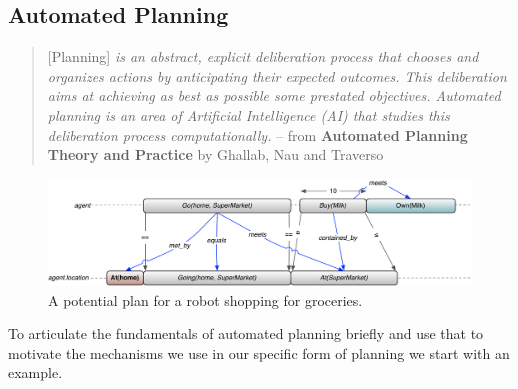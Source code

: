 \subsection{Automated Planning}
\label{sec:planningfound}

{\scriptsize
  \begin{quote}
[Planning] \emph{is an abstract, explicit deliberation process that chooses and
organizes actions by anticipating their expected outcomes. This
deliberation aims at achieving as best as possible some prestated
objectives. Automated planning is an area of Artificial Intelligence
(AI) that studies this deliberation process computationally.} -- from
\textbf{Automated Planning Theory and Practice} by Ghallab, Nau and
Traverso \cite{ghallab04} 
\end{quote}
}

\begin{figure} \centering
  \includegraphics[scale=0.35]{figs/shopping_europa.pdf}
  \caption{\small A potential plan for a robot shopping for groceries.}
\label{fig:shop:shopping}
\end{figure}

To articulate the fundamentals of automated planning briefly and use
that to motivate the mechanisms we use in our specific form of
planning we start with an example.

